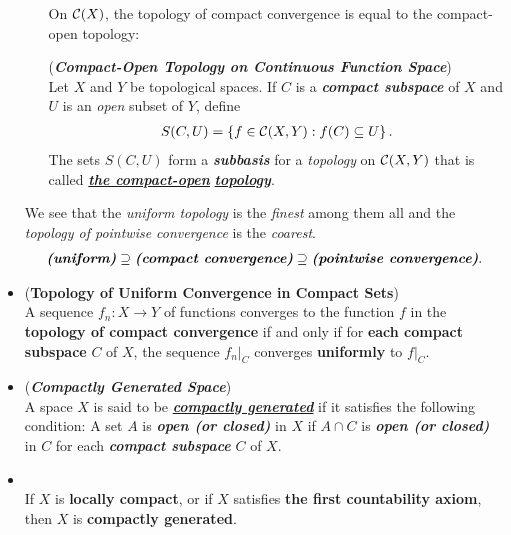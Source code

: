 \documentclass[11pt]{article}
\begin{document}
\begin{itemize}
\begin{remark}
\begin{enumerate}
On ${\mathcal C}(X)$, the topology of compact convergence is equal to the compact-open topology: 
 \begin{definition} (\emph{\textbf{Compact-Open Topology on Continuous Function Space}})\\
Let $X$ and $Y$ be topological spaces. If $C$ is a \emph{\textbf{compact subspace}} of $X$ and $U$ is an \emph{open} subset of $Y$, define
\begin{align*}
S(C,U) = \left\{ f \in {\mathcal C}(X, Y): f(C) \subseteq U\right\}.
\end{align*}
The sets $S(C, U)$ form a \emph{\textbf{subbasis}} for a \emph{topology} on ${\mathcal C}(X, Y)$ that is called \underline{\emph{\textbf{the compact-open}}} \underline{\emph{\textbf{topology}}}.
\end{definition}
\end{enumerate} 
We see that the \emph{uniform topology} is the \emph{finest} among them all and the \emph{topology of pointwise convergence} is the \emph{coarest}.
\begin{align*}
\text{\textbf{\emph{(uniform)}}} \supseteq \text{\textbf{\emph{(compact convergence)}}} \supseteq \text{\emph{\textbf{(pointwise convergence)}}}.
\end{align*}
\end{remark}

\item \begin{proposition} (\textbf{Topology of Uniform Convergence in Compact Sets}) \citep{munkres2000topology}\\
A sequence $f_n : X \rightarrow Y$ of functions converges to the function $f$ in the \textbf{topology of compact convergence} if and only if for \textbf{each compact subspace} $C$ of $X$, the sequence $f_n|_{C}$ converges \textbf{uniformly} to $f|_C$.
\end{proposition}

\item \begin{definition} (\emph{\textbf{Compactly Generated Space}})\\
A space $X$ is said to be \underline{\emph{\textbf{compactly generated}}} if it satisfies the following condition: A set $A$ is \emph{\textbf{open (or closed)}} in $X$ if $A \cap C$ is \emph{\textbf{open (or closed)}} in $C$ for each \textbf{\emph{compact subspace}} $C$ of $X$.
\end{definition}

\item \begin{lemma} \citep{munkres2000topology}\\
If $X$ is \textbf{locally compact}, or if $X$ satisfies \textbf{the first countability axiom}, then $X$ is \textbf{compactly generated}.
\end{lemma}




\end{itemize}
\end{document}
